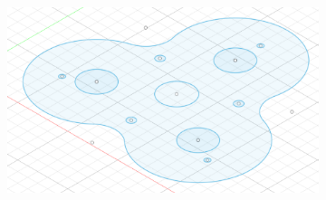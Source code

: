 \documentclass[twoside]{article}
\begin{document}
\begin{figure}[H]
\begin{subfigure}[b]{0.33\linewidth}
		\includegraphics[width=\textwidth]{plate_cad}
	\end{subfigure}
	

\end{figure}
\end{document}
